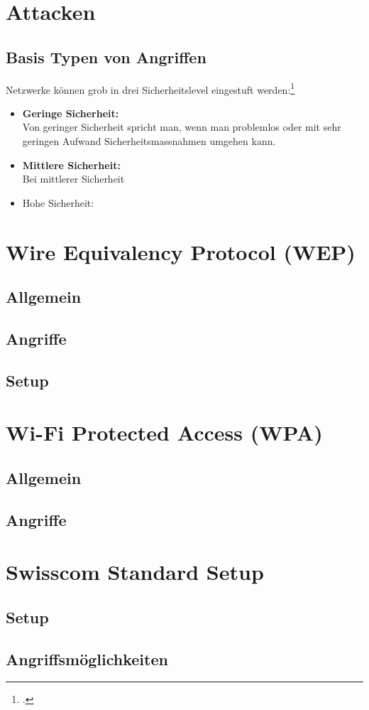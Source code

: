 \chapter{Attacken}

\section{Basis Typen von Angriffen}
Netzwerke können grob in drei Sicherheitslevel eingestuft werden:\footcite[][115]{WrightCache201503}
\begin{itemize}
	\item \textbf{Geringe Sicherheit:}\\
	Von geringer Sicherheit spricht man, wenn man problemlos oder mit sehr geringen Aufwand Sicherheitsmassnahmen umgehen kann.

	\item \textbf{Mittlere Sicherheit:}\\
	Bei mittlerer Sicherheit
	
	\item Hohe Sicherheit:
\end{itemize}




\chapter{Wire Equivalency Protocol (WEP)}

\section{Allgemein}


\section{Angriffe}

\section{Setup}




\chapter{Wi-Fi Protected Access (WPA)}

\section{Allgemein}

\section{Angriffe}




\chapter{Swisscom Standard Setup}

\section{Setup}

\section{Angriffsmöglichkeiten}